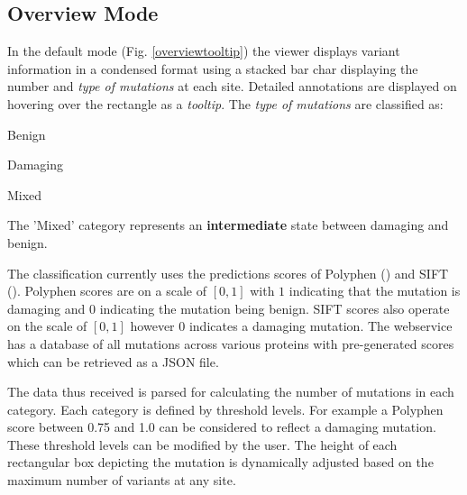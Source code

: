 \documentclass{bioinfo}
\begin{document}
\subsection{Overview Mode}
In the default mode (Fig. \ref{overviewtooltip}) the viewer displays variant information in a condensed format using a stacked bar char displaying the number and \textit{type of mutations} at each site. Detailed annotations are displayed on hovering over the rectangle as a \textit{tooltip}.
The \textit{type of mutations} are classified as:
\begin{inparaenum}[(a)]
\item {Benign} %
\item {Damaging} %
\item {Mixed}
\end{inparaenum}

The 'Mixed' category represents an \textbf{intermediate} state between damaging and benign.


The classification currently uses the predictions scores of Polyphen (\cite{Ramensky2002}) and SIFT (\cite{Kumar2009}). Polyphen scores are on a scale of $[0,1]$ with $1$ indicating that the mutation is damaging and $0$ indicating the mutation being benign. SIFT scores also operate on the scale of $[0,1]$ however $0$ indicates a damaging mutation.
The webservice has a database of all mutations across various proteins with pre-generated scores which can be retrieved as a JSON file.

The data thus received is parsed for calculating the number of mutations in each category. Each category is defined by threshold levels. For example a Polyphen score between 0.75 and 1.0 can be considered to reflect a damaging mutation. These threshold levels can be modified by the user. The height of each rectangular box depicting the mutation is dynamically adjusted based on the maximum number of variants at any site.

\end{document}
